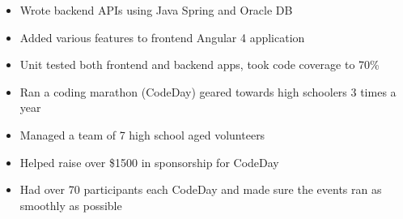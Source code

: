\documentclass[10pt,a4paper,ragged2e]{altacv}
\begin{document}

\begin{fullwidth}
\makecvheader
\end{fullwidth}



\begin{itemize}
\item Wrote backend APIs using Java Spring and Oracle DB
\item Added various features to frontend Angular 4 application
\item Unit tested both frontend and backend apps, took code coverage to 70\%
\end{itemize}

\divider

\begin{itemize}
\item Ran a coding marathon (CodeDay) geared towards high schoolers 3 times a year
\item Managed a team of 7 high school aged volunteers
\item Helped raise over \$1500 in sponsorship for CodeDay
\item Had over 70 participants each CodeDay and made sure the events ran as smoothly as possible
\end{itemize}
\end{document}
